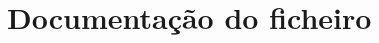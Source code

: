 \documentclass[a4paper]{book}
\begin{document}
\chapter{\-Documentação do ficheiro}











\printindex
\end{document}
